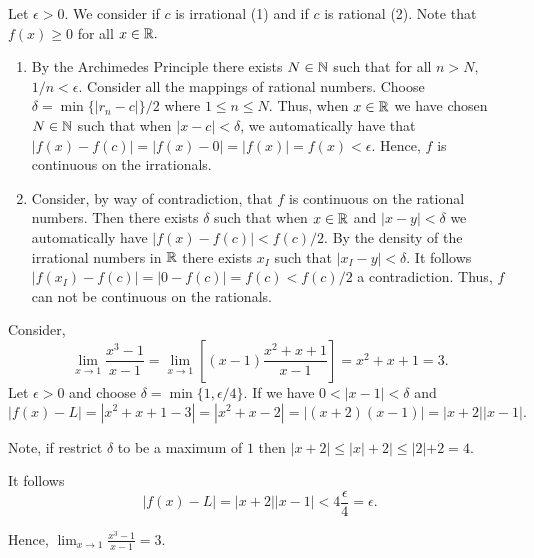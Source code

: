 \documentclass{report}
\begin{document}
\pagebreak
{}

\begin{myproof}

  Let $\epsilon > 0.$ We consider if $c$ is irrational (1) and if $c$ is rational (2). Note that $f(x) \geq0 $ for all $x \in \RR.$

  \begin{enumerate}
    \item 
  By the Archimedes Principle there exists $N \in \NN$ such that for all $n>N,$ $1/n < \epsilon.$ Consider all the mappings of rational numbers. Choose $\delta = \min\{|r_n - c|\}/2$ where $1\leq n \leq N.$ Thus, when $x\in \RR$ we have chosen $N \in \NN$ such that when $|x-c|< \delta$, we automatically have that $|f(x) - f(c)|= |f(x) - 0| = |f(x)| = f(x)<\epsilon.$ Hence, $f$ is continuous on the irrationals.
\item Consider, by way of contradiction, that $f$ is continuous on the rational numbers. Then there exists $\delta$ such that when $x\in \RR$ and $|x-y| <\delta$ we automatically have $|f(x) - f(c)| < f(c)/2.$ By the density of the irrational numbers in $\RR$ there exists $x_I$ such that $|x_I - y| < \delta.$ It follows $|f(x_I) - f(c)|= |0 - f(c)| = f(c) < f(c)/2$ a contradiction. Thus, $f$ can not be continuous on the rationals.
      
  \end{enumerate}

    
\end{myproof}

\begin{myproof}
  Consider,
  $$ \lim _{x \rightarrow 1} \frac{x^3-1}{x-1}= \lim _{x \rightarrow 1}\left[ (x-1)\frac{x^2+x+1}{x-1}\right]= x^2+x+1 = 3.$$ Let $\epsilon >0$ and choose $\delta = \min\{1,\epsilon/4\}$. If we have $0<|x-1| < \delta$ and $$|f(x) - L|= |x^2 +x +1 - 3| = |x^2 +x- 2|= |(x+2)(x-1)| = |x+2||x-1|.$$

Note, if restrict $\delta$ to be a maximum of $1$ then $|x+2| \leq |x| + 2 | \leq |2| + 2 = 4.$

It follows $$|f(x) - L| = |x+2||x-1|<4  \frac{\epsilon}{4}= \epsilon.$$

Hence, 
$\lim _{x \rightarrow 1} \frac{x^3-1}{x-1}=3.$

\end{myproof}
\end{document}
